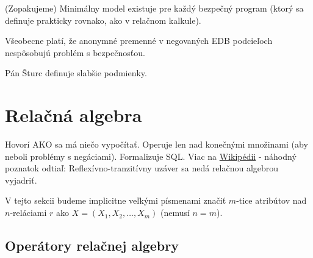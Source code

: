 \documentclass[10pt,a4paper]{article}
\begin{document}
(Zopakujeme) Minimálny model existuje pre každý bezpečný program (ktorý sa definuje prakticky rovnako, ako v relačnom kalkule).
 
Všeobecne platí, že anonymné premenné v negovaných EDB podcieľoch
nespôsobujú problém s bezpečnosťou.
 
Pán Šturc definuje slabšie podmienky. 
    
\section{Relačná algebra} 
\label{relacna_algebra}

Hovorí AKO sa má niečo vypočítať. Operuje len nad konečnými množinami (aby neboli problémy s negáciami). Formalizuje SQL. Viac na \href{http://en.wikipedia.org/wiki/Relational_algebra}{Wikipédii} - náhodný poznatok odtiaľ: Reflexívno-tranzitívny uzáver sa nedá relačnou algebrou vyjadriť. 
 
V tejto sekcii budeme implicitne veľkými písmenami značiť $m$-tice atribútov nad $n$-reláciami $r$ ako $X = (X_1, X_2, \ldots, X_m)$ (nemusí $n=m$). 

\subsection{Operátory relačnej algebry}
\end{document}
